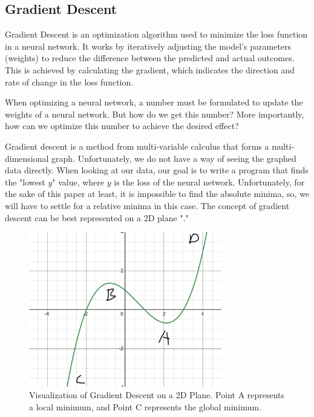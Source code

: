 \subsection*{Gradient Descent}

Gradient Descent is an optimization algorithm used to minimize the loss function in a neural network. It works by iteratively adjusting the model's parameters (weights) to reduce the difference between the predicted and actual outcomes. This is achieved by calculating the gradient, which indicates the direction and rate of change in the loss function.

When optimizing a neural network, a number must be formulated to update the weights of a neural network. But how do we get this number? More importantly, how can we optimize this number to achieve the desired effect?

Gradient descent is a method from multi-variable calculus that forms a multi-dimensional graph. Unfortunately, we do not have a way of seeing the graphed data directly. When looking at our data, our goal is to write a program that finds the "lowest $y$" value, where $y$ is the loss of the neural network. Unfortunately, for the sake of this paper at least, it is impossible to find the absolute minima, so, we will have to settle for a relative minima in this case. The concept of gradient descent can be best represented on a 2D plane "\cite{3b1b_2}."

\begin{figure}[H]
    \centering
    \includegraphics[width=0.75\textwidth]{images/GradientDescent.jpg}
    \caption{Visualization of Gradient Descent on a 2D Plane. Point A represents a local minimum, and Point C represents the global minimum.}
    \label{fig:gradient_descent}
\end{figure}

